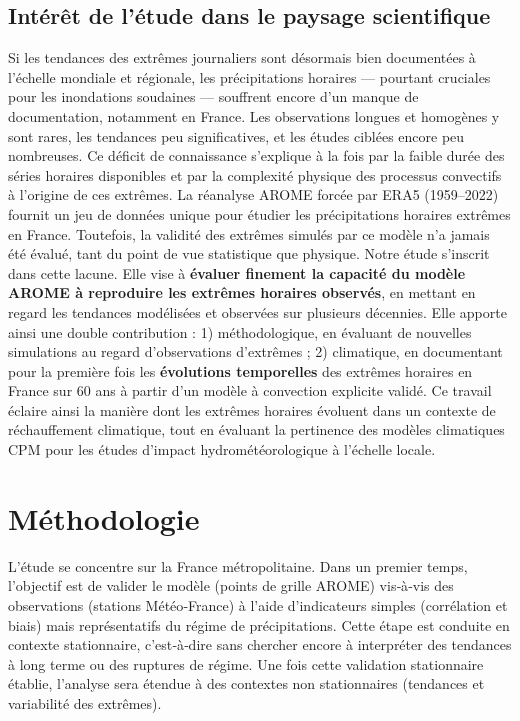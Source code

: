 \documentclass[
  article,
  nofooter,
  noheadings]{jss}
\begin{document}
\subsection{Intérêt de l'étude dans le paysage
scientifique}\label{intuxe9ruxeat-de-luxe9tude-dans-le-paysage-scientifique}

Si les tendances des extrêmes journaliers sont désormais bien
documentées à l'échelle mondiale et régionale, les précipitations
horaires --- pourtant cruciales pour les inondations soudaines ---
souffrent encore d'un manque de documentation, notamment en France. Les
observations longues et homogènes y sont rares, les tendances peu
significatives, et les études ciblées encore peu nombreuses. Ce déficit
de connaissance s'explique à la fois par la faible durée des séries
horaires disponibles et par la complexité physique des processus
convectifs à l'origine de ces extrêmes. La réanalyse AROME forcée par
ERA5 (1959--2022) fournit un jeu de données unique pour étudier les
précipitations horaires extrêmes en France. Toutefois, la validité des
extrêmes simulés par ce modèle n'a jamais été évalué, tant du point de
vue statistique que physique. Notre étude s'inscrit dans cette lacune.
Elle vise à \textbf{évaluer finement la capacité du modèle AROME à
reproduire les extrêmes horaires observés}, en mettant en regard les
tendances modélisées et observées sur plusieurs décennies. Elle apporte
ainsi une double contribution : 1) méthodologique, en évaluant de
nouvelles simulations au regard d'observations d'extrêmes ; 2)
climatique, en documentant pour la première fois les \textbf{évolutions
temporelles} des extrêmes horaires en France sur 60 ans à partir d'un
modèle à convection explicite validé. Ce travail éclaire ainsi la
manière dont les extrêmes horaires évoluent dans un contexte de
réchauffement climatique, tout en évaluant la pertinence des modèles
climatiques CPM pour les études d'impact hydrométéorologique à l'échelle
locale.

\section{Méthodologie}\label{muxe9thodologie}

L'étude se concentre sur la France métropolitaine. Dans un premier
temps, l'objectif est de valider le modèle (points de grille AROME)
vis‑à‑vis des observations (stations Météo‑France) à l'aide
d'indicateurs simples (corrélation et biais) mais représentatifs du
régime de précipitations. Cette étape est conduite en contexte
stationnaire, c'est‑à‑dire sans chercher encore à interpréter des
tendances à long terme ou des ruptures de régime. Une fois cette
validation stationnaire établie, l'analyse sera étendue à des contextes
non stationnaires (tendances et variabilité des extrêmes).
\end{document}
